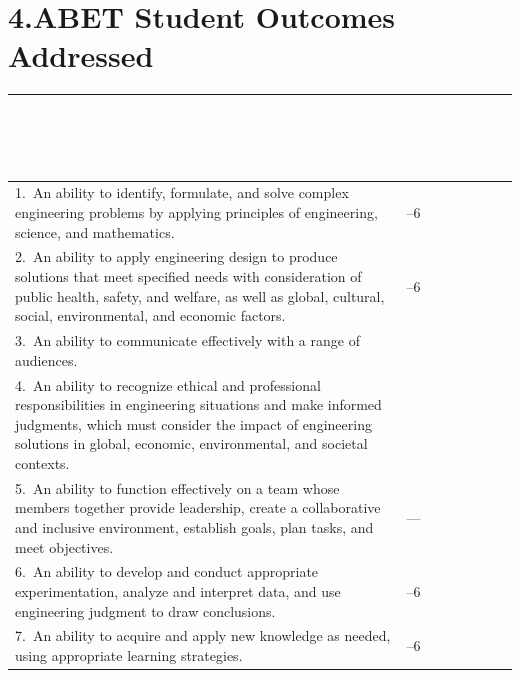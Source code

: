 \documentclass[11pt,a4paper]{article}
\begin{document}
\section*{4.\quad ABET Student Outcomes Addressed}
\renewcommand{\arraystretch}{1.35}
\begin{tabularx}{\linewidth}{X >{\centering\arraybackslash}p{3.2cm}}
  \toprule
  \rowcolor{kmutnbBlue!90}
  \textcolor{white}{\textbf{ABET Student Outcome (SO)}} &
  \textcolor{white}{\textbf{Course Learning Outcome (CLO)}} \\
  \midrule
  1.\ An ability to identify, formulate, and solve complex engineering problems
      by applying principles of engineering, science, and mathematics.
  & 1--6 \\
  \rowcolor{lightGray}
  2.\ An ability to apply engineering design to produce solutions that meet
      specified needs with consideration of public health, safety, and welfare,
      as well as global, cultural, social, environmental, and economic factors.
  & 1--6 \\
  3.\ An ability to communicate effectively with a range of audiences.
  & 6 \\
  \rowcolor{lightGray}
  4.\ An ability to recognize ethical and professional responsibilities in
      engineering situations and make informed judgments, which must consider
      the impact of engineering solutions in global, economic, environmental,
      and societal contexts.
  & 6 \\
  5.\ An ability to function effectively on a team whose members together
      provide leadership, create a collaborative and inclusive environment,
      establish goals, plan tasks, and meet objectives.
  & --- \\
  \rowcolor{lightGray}
  6.\ An ability to develop and conduct appropriate experimentation, analyze
      and interpret data, and use engineering judgment to draw conclusions.
  & 1--6 \\
  7.\ An ability to acquire and apply new knowledge as needed, using
      appropriate learning strategies.
  & 1--6 \\
  \bottomrule
\end{tabularx}

\end{document}
